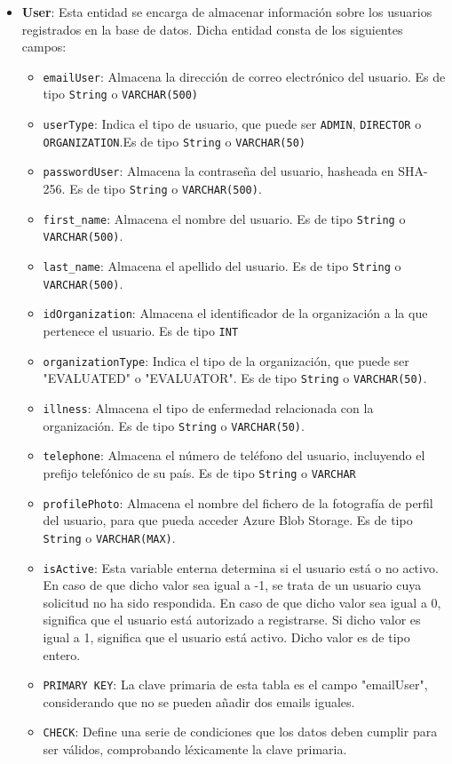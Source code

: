 \begin{itemize}
    
    \item \textbf{User}: Esta entidad se encarga de almacenar información sobre los usuarios registrados en la base de datos. Dicha entidad consta de los siguientes campos:
    \begin{itemize}
        \item \texttt{emailUser}: Almacena la dirección de correo electrónico del usuario. Es de tipo \texttt{String} o \texttt{VARCHAR(500)}
        \item \texttt{userType}: Indica el tipo de usuario, que puede ser \texttt{ADMIN}, \texttt{DIRECTOR} o \texttt{ORGANIZATION}.Es de tipo \texttt{String} o \texttt{VARCHAR(50)}
        \item \texttt{passwordUser}: Almacena la contraseña del usuario, hasheada en SHA-256. Es de tipo \texttt{String} o \texttt{VARCHAR(500)}.
        \item \texttt{first\_name}: Almacena el nombre del usuario. Es de tipo \texttt{String} o \texttt{VARCHAR(500)}.
        \item \texttt{last\_name}: Almacena el apellido del usuario. Es de tipo \texttt{String} o \texttt{VARCHAR(500)}.
        \item \texttt{idOrganization}: Almacena el identificador de la organización a la
        que pertenece el usuario. Es de tipo \texttt{INT}
        \item \texttt{organizationType}: Indica el tipo de la organización, que
        puede ser "EVALUATED" o "EVALUATOR". Es de tipo \texttt{String} o \texttt{VARCHAR(50)}.
        \item \texttt{illness}: Almacena el tipo de enfermedad relacionada con
        la organización. Es de tipo \texttt{String} o \texttt{VARCHAR(50)}.
        \item \texttt{telephone}: Almacena el número de teléfono del usuario,
        incluyendo el prefijo telefónico de su país. Es de tipo \texttt{String} o
        \texttt{VARCHAR}
        \item \texttt{profilePhoto}: Almacena el nombre del fichero de la fotografía de perfil del usuario, para que pueda acceder Azure Blob Storage. Es de tipo \texttt{String} o \texttt{VARCHAR(MAX)}.
        \item \texttt{isActive}: Esta variable enterna determina si el usuario está o no activo. En caso de que dicho valor sea igual a -1, se trata de un usuario cuya solicitud no ha sido respondida. En caso de que dicho valor sea igual a 0, significa que el usuario está autorizado a registrarse. Si dicho valor es igual a 1, significa que el usuario está activo. Dicho valor es de tipo entero.
        \item \texttt{PRIMARY KEY}: La clave primaria de esta tabla es el campo "emailUser", considerando que no se pueden añadir dos emails iguales.
        \item \texttt{CHECK}: Define una serie de condiciones que los datos deben cumplir para ser válidos, comprobando léxicamente la clave primaria.
      \end{itemize}


\end{itemize}
